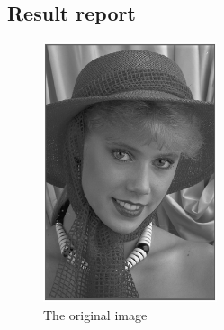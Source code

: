 \documentclass[paper=a4, fontsize=11pt]{scrartcl} %
\numberwithin{equation}{section} %
\numberwithin{figure}{section} %
\numberwithin{table}{section} %
\begin{document}
\subsection{Result report}
\begin{figure}[H]
	
	\centering
	\includegraphics[height =3in]{imgo.eps}
	\caption{The original image}
	
	
	
\end{figure}
\end{document}
